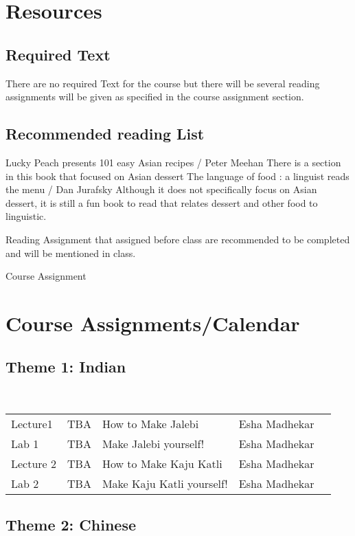 \documentclass{article}
\begin{document}
\section{Resources}
\subsection{Required Text}
There are no required Text for the course but there will be several reading assignments will be given as specified in the course assignment section. 

\subsection{Recommended reading List}

Lucky Peach presents 101 easy Asian recipes / Peter Meehan 
There is a section in this book that focused on Asian dessert
The language of food : a linguist reads the menu / Dan Jurafsky
Although it does not specifically focus on Asian dessert, it is still a fun book to read that relates dessert and other food to linguistic.

Reading Assignment that assigned before class are recommended to be completed and will be mentioned in class.

Course Assignment


\section{Course Assignments/Calendar}

\subsection*{Theme 1: Indian }\\



\begin{table}[h]
\begin{tabular}{lllll}
 Lecture1 &  TBA & How to Make Jalebi & Esha Madhekar  \\
 Lab 1 &  TBA & Make Jalebi yourself! & Esha Madhekar  \\
 Lecture 2 &  TBA & How to Make Kaju Katli & Esha Madhekar  \\
 Lab 2 & TBA & Make Kaju Katli yourself! & Esha Madhekar 
\end{tabular}
\end{table}



 \subsection*{Theme 2: Chinese }\\
\end{document}
